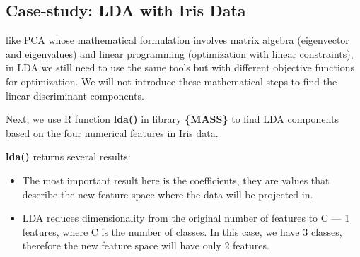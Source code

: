 \documentclass[
]{article}
\newenvironment{Shaded}{\begin{snugshade}}{\end{snugshade}}
\newcommand{\AttributeTok}[1]{\textcolor[rgb]{0.13,0.29,0.53}{#1}}
\newcommand{\CommentTok}[1]{\textcolor[rgb]{0.56,0.35,0.01}{\textit{#1}}}
\newcommand{\ConstantTok}[1]{\textcolor[rgb]{0.56,0.35,0.01}{#1}}
\newcommand{\FloatTok}[1]{\textcolor[rgb]{0.00,0.00,0.81}{#1}}
\newcommand{\FunctionTok}[1]{\textcolor[rgb]{0.13,0.29,0.53}{\textbf{#1}}}
\newcommand{\NormalTok}[1]{#1}
\newcommand{\OtherTok}[1]{\textcolor[rgb]{0.56,0.35,0.01}{#1}}
\newcommand{\SpecialCharTok}[1]{\textcolor[rgb]{0.81,0.36,0.00}{\textbf{#1}}}
\newcommand{\StringTok}[1]{\textcolor[rgb]{0.31,0.60,0.02}{#1}}
\begin{document}
\hypertarget{case-study-lda-with-iris-data}{%
\subsection{Case-study: LDA with Iris
Data}\label{case-study-lda-with-iris-data}}

like PCA whose mathematical formulation involves matrix algebra
(eigenvector and eigenvalues) and linear programming (optimization with
linear constraints), in LDA we still need to use the same tools but with
different objective functions for optimization. We will not introduce
these mathematical steps to find the linear discriminant components.

Next, we use R function \textbf{lda()} in library \textbf{\{MASS\}} to
find LDA components based on the four numerical features in Iris data.

\textbf{lda()} returns several results:

\begin{itemize}
\item
  The most important result here is the coefficients, they are values
  that describe the new feature space where the data will be projected
  in.
\item
  LDA reduces dimensionality from the original number of features to C
  --- 1 features, where C is the number of classes. In this case, we
  have 3 classes, therefore the new feature space will have only 2
  features.
\end{itemize}

\begin{Shaded}
\end{Shaded}
\end{document}
